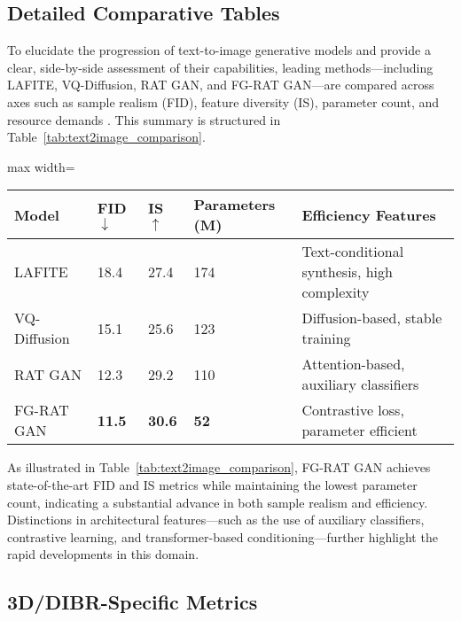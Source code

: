 \subsection{Detailed Comparative Tables}

To elucidate the progression of text-to-image generative models and provide a clear, side-by-side assessment of their capabilities, leading methods—including LAFITE, VQ-Diffusion, RAT GAN, and FG-RAT GAN—are compared across axes such as sample realism (FID), feature diversity (IS), parameter count, and resource demands \cite{ref101}. This summary is structured in Table~\ref{tab:text2image_comparison}.

\begin{table*}[htbp]
\centering
\caption{Comparison of leading text-to-image generation models on major metrics.}
\label{tab:text2image_comparison}
\begin{adjustbox}{max width=\textwidth}
\begin{tabular}{lllll}
\toprule
\textbf{Model} & \textbf{FID} $\downarrow$ & \textbf{IS} $\uparrow$ & \textbf{Parameters (M)} & \textbf{Efficiency Features} \\
\midrule
LAFITE      & 18.4    & 27.4   & 174     & Text-conditional synthesis, high complexity \\
VQ-Diffusion& 15.1    & 25.6   & 123     & Diffusion-based, stable training \\
RAT GAN     & 12.3    & 29.2   & 110     & Attention-based, auxiliary classifiers \\
FG-RAT GAN  & \textbf{11.5}    & \textbf{30.6}   & \textbf{52}      & Contrastive loss, parameter efficient \\
\bottomrule
\end{tabular}
\end{adjustbox}
\end{table*}

As illustrated in Table~\ref{tab:text2image_comparison}, FG-RAT GAN achieves state-of-the-art FID and IS metrics while maintaining the lowest parameter count, indicating a substantial advance in both sample realism and efficiency. Distinctions in architectural features—such as the use of auxiliary classifiers, contrastive learning, and transformer-based conditioning—further highlight the rapid developments in this domain.

\subsection{3D/DIBR-Specific Metrics}

